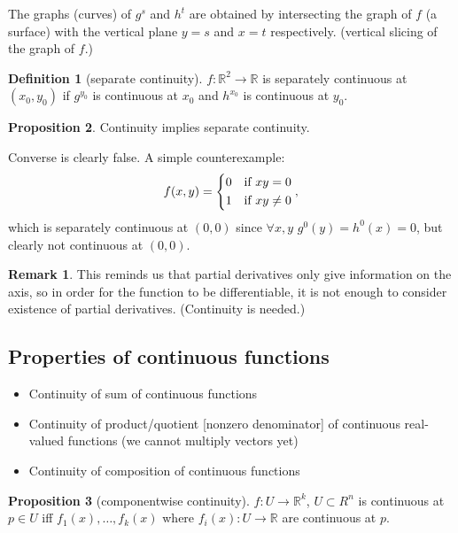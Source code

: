 \documentclass[a4paper]{article}
\theoremstyle{definition}
\newtheorem{defn}{Definition}[subsection]
\newtheorem{prop}[defn]{Proposition}
\newtheorem*{remark}{Remark}
\begin{document}
The graphs (curves) of $g^s$ and $h^t$ are obtained by intersecting the graph of $f$ (a surface) with the vertical plane $y=s$ and $x=t$ respectively. (vertical slicing of the graph of $f$.)

\begin{defn} [separate continuity]
	$f:\mathbb R^2 \rightarrow \mathbb R$ is separately continuous at $(x_0,y_0)$ if $g^{y_0}$ is continuous at $x_0$ and $h^{x_0}$ is continuous at $y_0$.
\end{defn}

\begin{prop}
	Continuity implies separate continuity.
\end{prop}

Converse is clearly false. A simple counterexample:
\[
f(x,y)=\left\{ \begin{aligned} 0 &\text{\quad if } xy=0 \\ 1 &\text{\quad if } xy \neq 0\end{aligned} \right. ,
\]
which is separately continuous at $(0,0)$ since $\forall x,y$ $g^0 (y) = h^0 (x) = 0$, but clearly not continuous at $(0,0)$.

\begin{remark}
	This reminds us that partial derivatives only give information on the axis, so in order for the function to be differentiable, it is not enough to consider existence of partial derivatives. (Continuity is needed.)
\end{remark}

\subsection{Properties of continuous functions}
\begin{itemize}
	\item Continuity of sum of continuous functions
	\item Continuity of product/quotient [nonzero denominator] of continuous real-valued functions (we cannot multiply vectors yet)
	\item Continuity of composition of continuous functions
\end{itemize}

\begin{prop} [componentwise continuity]
	$f:U\rightarrow \mathbb R^k$, $U\subset R^n$ is continuous at $p\in U$ iff $f_1(x),\ldots ,f_k(x)$ where $f_i(x):U\rightarrow \mathbb R$ are continuous at $p$.
\end{prop}
\end{document}

